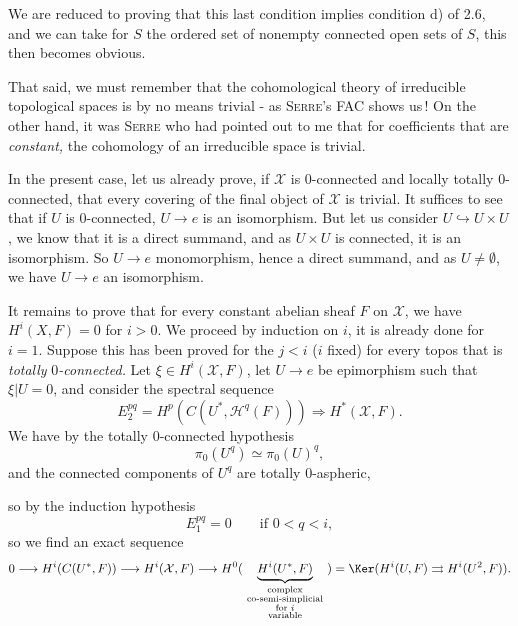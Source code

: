 
We are reduced to proving that this last condition implies condition d) of 2.6, and we can take for $S$ the ordered set of nonempty connected open sets of $S$, this then becomes obvious.

That said, we must remember that the cohomological theory of irreducible topological spaces is by no means trivial - as \textsc{Serre}'s FAC shows us\,! On the other hand, it was \textsc{Serre} who had pointed out to me that for coefficients that are \textit{constant,} the cohomology of an irreducible space is trivial.

In the present case, let us already prove, if $\mathcal{X}$ is 0-connected and locally totally 0-connected, that every covering of the final object of $\mathcal{X}$ is trivial. It suffices to see that if $U$ is 0-connected, $U \longrightarrow e$ is an isomorphism. But let us consider $U \hookrightarrow U \times U$, we know that it is a direct summand, and as $U \times U$ is connected, it is an isomorphism. So $U \longrightarrow e$ monomorphism, hence a direct summand, and as $U \neq \emptyset$, we have $U \longrightarrow e$ an isomorphism.

It remains to prove that for every constant abelian sheaf  $F$ on $\mathcal{X}$, we have $H^i(X,F)=0$ for $i>0$. We proceed by induction on $i$, it is already done for $i=1$. Suppose this has been proved for the $j<i$ ($i$ fixed) for every topos that is \textit{totally} 0\textit{-connected.} Let $\xi \in H^i(\mathcal{X},F)$, let $U \longrightarrow e$ be epimorphism such that $\xi|U=0$, and consider the spectral sequence %
\[
E_2^{pq} = H^p(C(U^*,\mathcal{H}^q(F))) \Longrightarrow H^*(\mathcal{X},F).
\]
We have by the totally 0-connected hypothesis
\[
\pi_0(U^q) \simeq \pi_0(U)^q, \tag*{$(*)$}
\]
and the connected components of $U^q$ are totally 0-aspheric,
\begin{center}
\end{center}
so by the induction hypothesis
\[
E_1^{pq} = 0 \qquad \text{if } 0<q<i,
\]
so we find an exact sequence
\[
0 \longrightarrow H^i(C(U^*,F)) \longrightarrow H^i(\mathcal{X},F) \longrightarrow H^0(\ \underbrace{H^i(U^*,F)}_{\substack{\text{complex}\\ \text{co-semi-simplicial}\\ \text{for } i\\ \text{variable}}}\ ) = \Ker(H^i(U,F) \rightrightarrows H^i(U^2,F)).
\]

